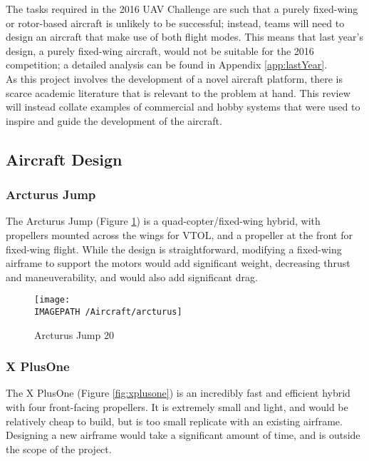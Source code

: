 The tasks required in the 2016 UAV Challenge are such that a purely fixed-wing or rotor-based aircraft is unlikely to be successful; instead, teams will need to design an aircraft that make use of both flight modes. This means that last year's design, a purely fixed-wing aircraft, would not be suitable for the 2016 competition; a detailed analysis can be found in Appendix \ref{app:lastYear}.\\

As this project involves the development of a novel aircraft platform, there is scarce academic literature that is relevant to the problem at hand. This review will instead collate examples of commercial and hobby systems that were used to inspire and guide the development of the aircraft.\\

\subsection{Aircraft Design}
\subsubsection*{Arcturus Jump}
The Arcturus Jump \cite{ref:arcturus} (Figure \ref{fig:arcturus}) is a quad-copter/fixed-wing hybrid, with propellers mounted across the wings for VTOL, and a propeller at the front for fixed-wing flight. While the design is straightforward, modifying a fixed-wing airframe to support the motors would add significant weight, decreasing thrust and maneuverability, and would also add significant drag.

\begin{figure}[!h]
	\centering
	\texttt{[image: \\IMAGEPATH /Aircraft/arcturus]}
	\caption{Arcturus Jump 20}
	\label{fig:arcturus}
\end{figure}

\subsubsection*{X PlusOne}
The X PlusOne \cite{ref:xplusone} (Figure \ref{fig:xplusone}) is an incredibly fast and efficient hybrid with four front-facing propellers. It is extremely small and light, and would be relatively cheap to build, but is too small replicate with an existing airframe. Designing a new airframe would take a significant amount of time, and is outside the scope of the project.

